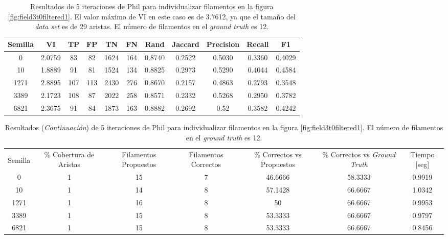 \begin{table}[h]
    \centering
    \begin{tabular}{|c|c|c|c|c|c|c|c|c|c|c|}
    \hline
        Semilla & VI & TP & FP &TN &FN & Rand	& Jaccard &	Precision &	Recall &	F1 \\ \hline 
        0    & 2.0759 & 83  & 82  & 1624 & 164 & 0.8740  & 0.2522  & 0.5030  & 0.3360 & 0.4029 \\
        10   & 1.8889  & 91  & 81  & 1524 & 134 & 0.8825 & 0.2973 & 0.5290  & 0.4044 & 0.4584 \\
        1271 & 2.8895 & 107 & 113 & 2430 & 276 & 0.8670 & 0.2157 & 0.4863 & 0.2793 & 0.3548\\
        3389 & 2.1723 & 108 & 87  & 2022 & 258 & 0.8571 & 0.2332 & 0.5268 & 0.2950 & 0.3782\\
        6821 & 2.3675 & 91  & 84  & 1873 & 163 & 0.8882 & 0.2692 & 0.52     & 0.3582 & 0.4242\\
        \hline
    \end{tabular}
    \caption{Resultados de 5 iteraciones de Phil para individualizar filamentos en la figura \ref{fig:field3t0filtered1}. El valor m\'aximo de VI en este caso es de 3.7612, ya que el tama\~no del {\it data set} es de 29 aristas. El n\'umero de filamentos en el {\it ground truth} es 12.}
    \label{tab:field3t0filteredDetailedResults1}
\end{table}
\addtocounter{table}{-1}
\begin{table}[h]
    \centering
    \begin{tabular}{|c|c|c|c|c|c|c|}
    \hline
         & \multirow{4}{2cm}{\centering \% Cobertura de Aristas} & \multirow{4}{2cm}{Filamentos Propuestos} & \multirow{4}{2cm}{Filamentos Correctos} & \multirow{4}{2.5cm}{\% Correctos vs Propuestos} & \multirow{4}{2.5cm}{\centering \% Correctos vs {\it Ground Truth}} & \multirow{4}{1.2cm}{\centering Tiempo [seg]} \\
         &  &  &  & & &  \\
        Semilla &  &  &  & & &  \\
        &  &  &  & & &  \\ \hline 
        0 & 1 & 15 & 7 & 46.6666 & 58.3333 & 0.9919  \\
        10 & 1 & 14 & 8 & 57.1428 & 66.6667 & 1.0342\\
        1271 & 1 & 16 & 8 & 50  & 66.6667 & 0.9953\\
        3389 & 1 & 15 & 8 & 53.3333 & 66.6667 & 0.9797\\
        6821 & 1 & 15 & 8 & 53.3333 & 66.6667 & 0.8456\\
        \hline
    \end{tabular}
    \caption{Resultados ({\it Continuaci\'on}) de 5 iteraciones de Phil para individualizar filamentos en la figura \ref{fig:field3t0filtered1}. El n\'umero de filamentos en el {\it ground truth} es 12.}
\end{table}

